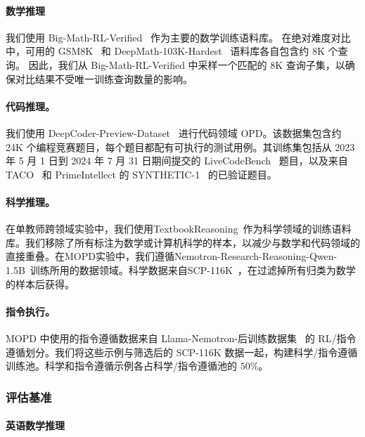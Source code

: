 \paragraph{数学推理}

我们使用 Big-Math-RL-Verified~\cite{albalak2025big} 作为主要的数学训练语料库。  
在绝对难度对比中，可用的 GSM8K~\cite{cobbe2021traininggsm8k} 和 DeepMath-103K-Hardest~\cite{he2026deepmathk} 语料库各自包含约 8K 个查询。  
因此，我们从 Big-Math-RL-Verified 中采样一个匹配的 8K 查询子集，以确保对比结果不受唯一训练查询数量的影响。

\paragraph{代码推理。}

我们使用 DeepCoder-Preview-Dataset~\cite{deepcoder2025} 进行代码领域 OPD。该数据集包含约 24K 个编程竞赛题目，每个题目都配有可执行的测试用例。其训练集包括从 2023 年 5 月 1 日到 2024 年 7 月 31 日期间提交的 LiveCodeBench~\cite{jain2025livecodebench} 题目，以及来自 TACO~\cite{li2023taco} 和 PrimeIntellect 的 SYNTHETIC-1~\cite{2025synthetic1} 的已验证题目。

\paragraph{科学推理。}

在单教师跨领域实验中，我们使用TextbookReasoning~\cite{fan2025megascience}作为科学领域的训练语料库。我们移除了所有标注为数学或计算机科学的样本，以减少与数学和代码领域的直接重叠。在MOPD实验中，我们遵循Nemotron-Research-Reasoning-Qwen-1.5B~\cite{liu2026prorl}训练所用的数据领域。科学数据来自SCP-116K~\cite{lu2025scp}，在过滤掉所有归类为数学的样本后获得。


\paragraph{指令执行。}

MOPD 中使用的指令遵循数据来自 Llama-Nemotron-后训练数据集~\cite{bercovich2025llamanemotron} 的 RL/指令遵循划分。我们将这些示例与筛选后的 SCP-116K 数据一起，构建科学/指令遵循训练池。科学和指令遵循示例各占科学/指令遵循池的 $50\%$。

\subsubsection{评估基准}
\label{sec:appendix_evaluation_datasets}

\paragraph{英语数学推理}


